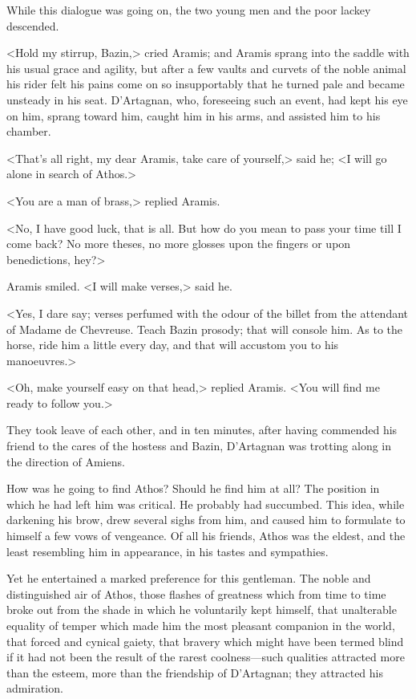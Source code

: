 While this dialogue was going on, the two young men and the poor lackey descended. 

<Hold my stirrup, Bazin,> cried Aramis; and Aramis sprang into the saddle with his usual grace and agility, but after a few vaults and curvets of the noble animal his rider felt his pains come on so insupportably that he turned pale and became unsteady in his seat. D'Artagnan, who, foreseeing such an event, had kept his eye on him, sprang toward him, caught him in his arms, and assisted him to his chamber. 

<That's all right, my dear Aramis, take care of yourself,> said he; <I will go alone in search of Athos.> 

<You are a man of brass,> replied Aramis. 

<No, I have good luck, that is all. But how do you mean to pass your time till I come back? No more theses, no more glosses upon the fingers or upon benedictions, hey?> 

Aramis smiled. <I will make verses,> said he. 

<Yes, I dare say; verses perfumed with the odour of the billet from the attendant of Madame de Chevreuse. Teach Bazin prosody; that will console him. As to the horse, ride him a little every day, and that will accustom you to his manoeuvres.> 

<Oh, make yourself easy on that head,> replied Aramis. <You will find me ready to follow you.> 

They took leave of each other, and in ten minutes, after having commended his friend to the cares of the hostess and Bazin, D'Artagnan was trotting along in the direction of Amiens. 

How was he going to find Athos? Should he find him at all? The position in which he had left him was critical. He probably had succumbed. This idea, while darkening his brow, drew several sighs from him, and caused him to formulate to himself a few vows of vengeance. Of all his friends, Athos was the eldest, and the least resembling him in appearance, in his tastes and sympathies. 

Yet he entertained a marked preference for this gentleman. The noble and distinguished air of Athos, those flashes of greatness which from time to time broke out from the shade in which he voluntarily kept himself, that unalterable equality of temper which made him the most pleasant companion in the world, that forced and cynical gaiety, that bravery which might have been termed blind if it had not been the result of the rarest coolness—such qualities attracted more than the esteem, more than the friendship of D'Artagnan; they attracted his admiration. 

